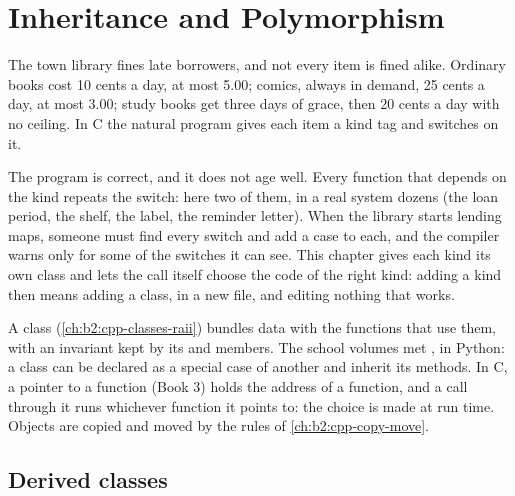\chapter{Inheritance and Polymorphism}\label{ch:b2:cpp-polymorphism}

The town library fines late borrowers, and not every item is fined alike. Ordinary books cost 10 cents a day, at
most 5.00; comics, always in demand, 25 cents a day, at most 3.00; study books get three days of grace, then 20
cents a day with no ceiling. In C the natural program gives each item a kind tag and switches on it.

\label{lst:b2:cpp-polymorphism:fines-switch}

\label{out:b2:cpp-polymorphism:fines-switch}

The program is correct, and it does not age well. Every function that depends on the kind repeats the switch: here
two of them, in a real system dozens (the loan period, the shelf, the label, the reminder letter). When the library
starts lending maps, someone must find every switch and add a case to each, and the compiler warns only for some
of the switches it can see. This chapter gives each kind its own class and lets the call itself choose the code of
the right kind: adding a kind then means adding a class, in a new file, and editing nothing that works.

\begin{recall}
A class (\cref{ch:b2:cpp-classes-raii}) bundles data with the functions that use them, with an invariant kept by
its  and members. The school volumes met , in Python: a class can be declared as a special
case of another and inherit its methods. In C, a pointer to a function (Book 3) holds the address of a function,
and a call through it runs whichever function it points to: the choice is made at run time. Objects are copied and
moved by the rules of \cref{ch:b2:cpp-copy-move}.
\end{recall}

\section{Derived classes}\label{sec:b2:cpp-polymorphism:derived}

